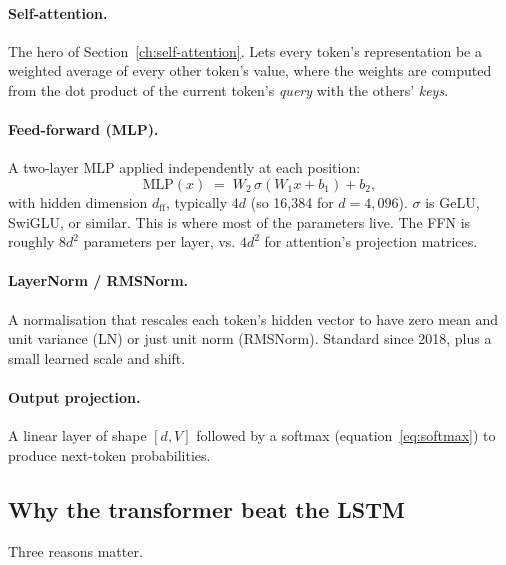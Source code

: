 \paragraph{Self-attention.} The hero of Section~\ref{ch:self-attention}.
Lets every token's representation be a weighted average of every other
token's value, where the weights are computed from the dot product of the
current token's \emph{query} with the others' \emph{keys}.

\paragraph{Feed-forward (MLP).} A two-layer MLP applied independently at
each position:
\begin{equation}
  \text{MLP}(x) \;=\; W_2\,\sigma(W_1 x + b_1) + b_2,
\end{equation}
with hidden dimension \(d_{\text{ff}}\), typically \(4d\) (so 16,384 for
\(d = 4{,}096\)). \(\sigma\) is GeLU, SwiGLU, or similar. This is where
most of the parameters live. The FFN is roughly \(8 d^2\) parameters per
layer, vs. \(4 d^2\) for attention's projection matrices.

\paragraph{LayerNorm / RMSNorm.} A normalisation that rescales each token's
hidden vector to have zero mean and unit variance (LN) or just unit norm
(RMSNorm). Standard since 2018, plus a small learned scale and shift.

\paragraph{Output projection.} A linear layer of shape \([d, V]\) followed
by a softmax (equation~\ref{eq:softmax}) to produce next-token probabilities.

\subsection{Why the transformer beat the LSTM}

Three reasons matter.

